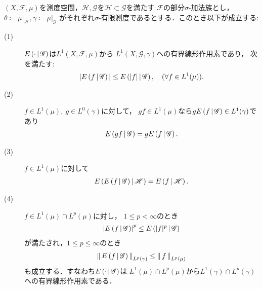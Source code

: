 	\begin{screen}
		\begin{thm}[条件付き期待値の性質]\label{thm:properties_of_conditional_expectations}
			$(X,\mathscr{F},\mu)$を測度空間，$\mathscr{H},\mathscr{G}$を$\mathscr{H} \subset \mathscr{G}$を満たす
			$\mathscr{F}$の部分$\sigma$-加法族とし，$\theta \coloneqq \left. \mu \right|_{\mathscr{H}},
			\gamma \coloneqq \left. \mu \right|_{\mathscr{G}}$
			がそれぞれ$\sigma$-有限測度であるとする．このとき以下が成立する:
			\begin{description}
				\item[(1)] $E\left( \cdot \, \middle|\, \mathscr{G} \right)$は$L^1(X,\mathscr{F},\mu)$から
					$L^1\left(X,\mathscr{G},\gamma\right)$への有界線形作用素であり，
					次を満たす:
					\begin{align}
						|E\left( f \, \middle|\, \mathscr{G} \right)| \leq E\left( |f| \, \middle|\, \mathscr{G} \right),
						\quad (\forall f \in L^1(\mu)).
						\label{eq:thm_properties_of_conditional_expectations_2}
					\end{align}
				
				\item[(2)] $f \in L^1(\mu),\ g \in L^0(\gamma)$に対して，
					$gf \in L^1(\mu)$なら$g E\left( f \, \middle|\, \mathscr{G} \right) \in L^1(\gamma)$であり
					\begin{align}
						E\left( gf \, \middle|\, \mathscr{G} \right) = gE\left( f \, \middle|\, \mathscr{G} \right).
						\label{eq:thm_properties_of_conditional_expectations_4}
					\end{align}
					
				\item[(3)] $f \in L^1(\mu)$に対して
					\begin{align}
						E\left( E\left( f \, \middle|\, \mathscr{G} \right) \, \middle|\, \mathscr{H} \right) = E\left( f \, \middle|\, \mathscr{H} \right).
					\end{align}
					
				\item[(4)] $f \in L^1(\mu) \cap L^p(\mu)$に対し，
					$1 \leq p < \infty$のとき
					\begin{align}
						\left| E\left( f \, \middle|\, \mathscr{G} \right) \right|^p
						\leq E\left( |f|^p \, \middle|\, \mathscr{G} \right)
					\end{align}
					が満たされ，$1 \leq p \leq \infty$のとき
					\begin{align}
						\left\|\, E\left( f \, \middle|\, \mathscr{G} \right)\, \right\|_{L^p(\gamma)}
						\leq \left\|\, f\, \right\|_{L^p(\mu)}
						\label{eq:thm_properties_of_conditional_expectations_3}
					\end{align}
					も成立する．すなわち$E\left( \cdot \, \middle|\, \mathscr{G} \right)$は
					$L^1(\mu) \cap L^p(\mu)$から$L^1(\gamma) \cap L^p(\gamma)$
					への有界線形作用素である．
			\end{description}
		\end{thm}
	\end{screen}
	
